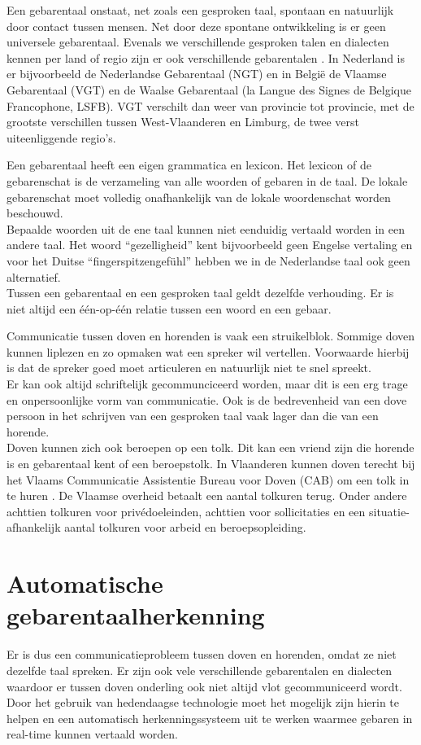 \npar Een gebarentaal onstaat, net zoals een gesproken taal, spontaan en natuurlijk door contact tussen mensen. Net door deze spontane ontwikkeling is er geen universele gebarentaal. Evenals we verschillende gesproken talen en dialecten kennen per land of regio zijn er ook verschillende gebarentalen \cite{VGT-standard}. In Nederland is er bijvoorbeeld de Nederlandse Gebarentaal (NGT) en in Belgi\"e de Vlaamse Gebarentaal (VGT) en de Waalse Gebarentaal (la Langue des Signes de Belgique Francophone, LSFB). VGT verschilt dan weer van provincie tot provincie, met de grootste verschillen tussen West-Vlaanderen en Limburg, de twee verst uiteenliggende regio's.

\npar Een gebarentaal heeft een eigen grammatica en lexicon. Het lexicon of de gebarenschat is de verzameling van alle woorden of gebaren in de taal. De lokale gebarenschat moet volledig onafhankelijk van de lokale woordenschat worden beschouwd.
\\Bepaalde woorden uit de ene taal kunnen niet eenduidig vertaald worden in een andere taal. Het woord ``gezelligheid'' kent bijvoorbeeld geen Engelse vertaling en voor het Duitse ``fingerspitzengef\"uhl'' hebben we in de Nederlandse taal ook geen alternatief.
\\Tussen een gebarentaal en een gesproken taal geldt dezelfde verhouding. Er is niet altijd een \'e\'en-op-\'e\'en relatie tussen een woord en een gebaar.

\npar Communicatie tussen doven en horenden is vaak een struikelblok. Sommige doven kunnen liplezen en zo opmaken wat een spreker wil vertellen. Voorwaarde hierbij is dat de spreker goed moet articuleren en natuurlijk niet te snel spreekt.
\\ Er kan ook altijd schriftelijk gecommunciceerd worden, maar dit is een erg trage en onpersoonlijke vorm van communicatie. Ook is de bedrevenheid van een dove persoon in het schrijven van een gesproken taal vaak lager dan die van een horende.
\\ Doven kunnen zich ook beroepen op een tolk. Dit kan een vriend zijn die horende is en gebarentaal kent of een beroepstolk. In Vlaanderen kunnen doven terecht bij het Vlaams Communicatie Assistentie Bureau voor Doven (CAB) om een tolk in te huren \cite{tolkuren}. De Vlaamse overheid betaalt een aantal tolkuren terug. Onder andere achttien tolkuren voor priv\'edoeleinden, achttien voor sollicitaties en een situatie-afhankelijk aantal tolkuren voor arbeid en beroepsopleiding.
 
\section{Automatische gebarentaalherkenning}
Er is dus een communicatieprobleem tussen doven en horenden, omdat ze niet dezelfde taal spreken. Er zijn ook vele verschillende gebarentalen en dialecten waardoor er tussen doven onderling ook niet altijd vlot gecommuniceerd wordt.
Door het gebruik van hedendaagse technologie moet het mogelijk zijn hierin te helpen en een automatisch herkenningssysteem uit te werken waarmee gebaren in real-time kunnen vertaald worden.


